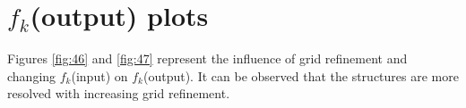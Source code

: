 \section{$f_k$(output) plots}
\hspace{0.25cm}Figures \ref{fig:46} and \ref{fig:47} represent the influence of grid refinement and changing $f_k$(input) on $f_k$(output). It can be observed that the structures are more resolved with increasing grid refinement. 

